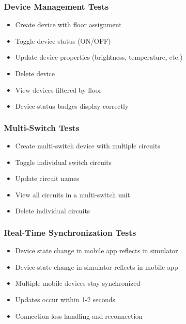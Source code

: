 \documentclass[12pt,a4paper]{article}
\begin{document}
\subsubsection{Device Management Tests}
\begin{itemize}[leftmargin=*]
    \item[$\square$] Create device with floor assignment
    \item[$\square$] Toggle device status (ON/OFF)
    \item[$\square$] Update device properties (brightness, temperature, etc.)
    \item[$\square$] Delete device
    \item[$\square$] View devices filtered by floor
    \item[$\square$] Device status badges display correctly
\end{itemize}

\subsubsection{Multi-Switch Tests}
\begin{itemize}[leftmargin=*]
    \item[$\square$] Create multi-switch device with multiple circuits
    \item[$\square$] Toggle individual switch circuits
    \item[$\square$] Update circuit names
    \item[$\square$] View all circuits in a multi-switch unit
    \item[$\square$] Delete individual circuits
\end{itemize}

\subsubsection{Real-Time Synchronization Tests}
\begin{itemize}[leftmargin=*]
    \item[$\square$] Device state change in mobile app reflects in simulator
    \item[$\square$] Device state change in simulator reflects in mobile app
    \item[$\square$] Multiple mobile devices stay synchronized
    \item[$\square$] Updates occur within 1-2 seconds
    \item[$\square$] Connection loss handling and reconnection
\end{itemize}
\end{document}
